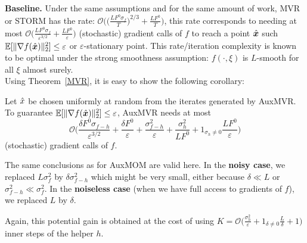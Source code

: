 \documentclass[10pt]{article} %
\theoremstyle{plain}
\theoremstyle{definition}
\theoremstyle{remark}
\newcommand{\norm}[1]{\|#1\|_2}
\def\vx{{\bm{x}}}
\newcommand{\E}{\mathbb{E}}
\begin{document}
\textbf{Baseline.} Under the same assumptions and for the same amount of work, MVR or STORM \citep{MVR} has the rate: $\mathcal{O}\bigg(\big(\frac{L F^0\sigma_f}{T}\big)^{2/3} + \frac{LF^0}{T}\bigg)$, this rate corresponds to needing at most $\mathcal{O}\bigg(\frac{L F^0\sigma_f}{\varepsilon^{3/2}} + \frac{LF^0}{\varepsilon}\bigg)$ (stochastic) gradient calls of $f$ to reach a point $\Hat{\vx}$ such $\E[\norm{\nabla f(\Hat{\vx})}^2]\leq \varepsilon$ or $\varepsilon$-stationary point. This rate/iteration complexity is known to be optimal under the strong smoothness assumption: $f(\cdot,\xi)$ is $L$-smooth for all $\xi$ almost surely.\\
Using Theorem~\ref{MVR}, it is easy to show the following corollary: \begin{framedcorollary}
Let $\Hat{x}$ be chosen uniformly at random from the iterates generated by AuxMVR.  To guarantee $\E[\|\nabla f(\Hat{\vx})\|_2^2]\leq \varepsilon$, AuxMVR needs at most $$\mathcal{O}\Big(\frac{\delta F^0\sigma_{f-h}}{\varepsilon^{3/2}} + \frac{\delta F^0}{\varepsilon} + \frac{\sigma_{f-h}^2}{\varepsilon} + \frac{\sigma_h^2}{LF^0} + 1_{\sigma_h\neq 0}\frac{LF^0}{\varepsilon} \Big)$$
(stochastic) gradient calls of $f$.   
\end{framedcorollary}
 
The same conclusions as for AuxMOM are valid here. In the \textbf{noisy case}, we replaced $L\sigma_f^2$ by $\delta \sigma_{f-h}^2$ which might be very small, either because $\delta\ll L$ or $\sigma_{f-h}^2\ll \sigma_f^2$. In the \textbf{noiseless case} (when we have full access to gradients of $f$), we replaced $L$ by $\delta$.

Again, this potential gain is obtained at the cost of using $K = \mathcal{O}\Big(\frac{\sigma_h^2}{\varepsilon} + 1_{\delta\neq 0}\frac{L}{\delta} + 1\Big)$ inner steps of the helper $h$.
\end{document}

